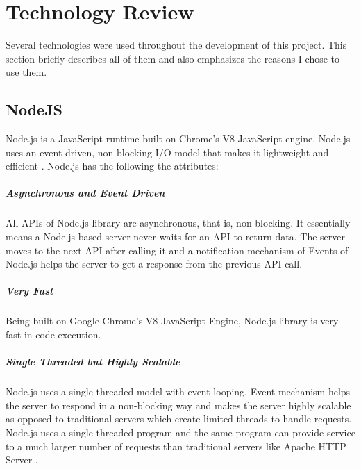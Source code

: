 \chapter{Technology Review}
Several technologies were used throughout the development of this project. This section briefly describes all of them and also emphasizes the reasons I chose to use them. 

\section{NodeJS}
Node.js is a JavaScript runtime built on Chrome's V8 JavaScript engine. Node.js uses an event-driven, non-blocking I/O model that makes it lightweight and efficient \cite{NodeJS}.
Node.js has the following the attributes:

\paragraph{Asynchronous and Event Driven}
\paragraph{}
All APIs of Node.js library are
asynchronous, that is, non-blocking. It essentially means a Node.js based
server never waits for an API to return data. The server moves to the next
API after calling it and a notification mechanism of Events of Node.js helps
the server to get a response from the previous API call.

\paragraph{Very Fast}
\paragraph{}
Being built on Google Chrome's V8 JavaScript Engine, Node.js
library is very fast in code execution.

\paragraph{Single Threaded but Highly Scalable}
\paragraph{}
Node.js uses a single threaded model with event looping. Event mechanism helps the server to respond in a non-blocking way and makes the server highly scalable as opposed to traditional servers which create limited threads to handle
requests. Node.js uses a single threaded program and the same program can provide service to a much larger number of requests than traditional servers like Apache HTTP Server \cite{NodeJS}.
